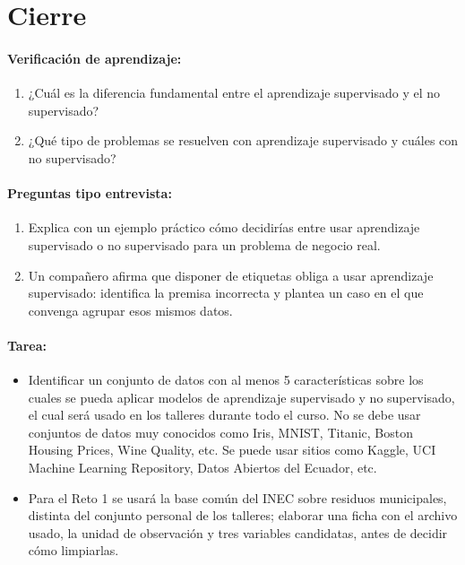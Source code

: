 \documentclass[a4,11pt]{aleph-notas}
\begin{document}
\section*{Cierre}

\paragraph{Verificación de aprendizaje:}
\begin{enumerate}[leftmargin=*]
    \item ¿Cuál es la diferencia fundamental entre el aprendizaje supervisado y el no supervisado?

    \item ¿Qué tipo de problemas se resuelven con aprendizaje supervisado y cuáles con no supervisado?
\end{enumerate}

\paragraph{Preguntas tipo entrevista:}
\begin{enumerate}[leftmargin=*]
    \item Explica con un ejemplo práctico cómo decidirías entre usar aprendizaje supervisado o no supervisado para un problema de negocio real.

    \item Un compañero afirma que disponer de etiquetas obliga a usar aprendizaje supervisado: identifica la premisa incorrecta y plantea un caso en el que convenga agrupar esos mismos datos.
\end{enumerate}

\paragraph{Tarea:}
\begin{itemize}
    \item
    Identificar un conjunto de datos con al menos 5 características sobre los cuales se pueda aplicar modelos de aprendizaje supervisado y no supervisado, el cual será usado en los talleres durante todo el curso. No se debe usar conjuntos de datos muy conocidos como Iris, MNIST, Titanic, Boston Housing Prices, Wine Quality, etc. Se puede usar sitios como Kaggle, UCI Machine Learning Repository, Datos Abiertos del Ecuador, etc.
    \item
    Para el Reto 1 se usará la base común del INEC sobre residuos municipales, distinta del conjunto personal de los talleres; elaborar una ficha con el archivo usado, la unidad de observación y tres variables candidatas, antes de decidir cómo limpiarlas.
\end{itemize}
\end{document}
